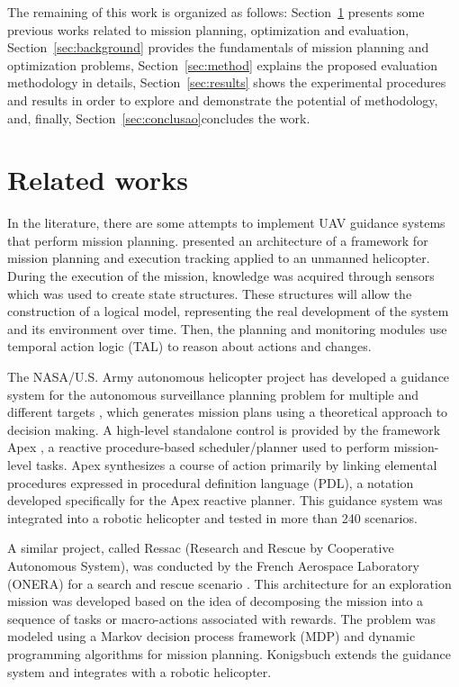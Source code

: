 \documentclass[conference,harvard,brazil,english]{sbatex}
\begin{document}
The remaining of this work is organized as follows: Section~\ref{sec:related} presents some previous works related to mission planning, optimization and evaluation, Section~\ref{sec:background} provides the fundamentals of mission planning and optimization problems, Section~\ref{sec:method} explains the proposed evaluation methodology in details, Section~\ref{sec:results} shows the experimental procedures and results in order to explore and demonstrate the potential of methodology, and, finally, Section~\ref{sec:conclusao}concludes the work.

\section{Related works}
\label{sec:related}

In the literature, there are some attempts to implement UAV guidance systems that perform mission planning.  presented an architecture of a framework for mission planning and execution tracking applied to an unmanned helicopter. During the execution of the mission, knowledge was acquired through sensors which was used to create state structures. These structures will allow the construction of a logical model, representing the real development of the system and its environment over time. Then, the planning and monitoring modules use temporal action logic (TAL) to reason about actions and changes.

The NASA/U.S. Army autonomous helicopter project has developed a guidance system for the autonomous surveillance planning problem for multiple and different targets \cite{whalley2005design}, which generates mission plans using a theoretical approach to decision making. A high-level standalone control is provided by the framework Apex \cite{baer1998nasa}, a reactive procedure-based scheduler/planner used to perform mission-level tasks. Apex synthesizes a course of action primarily by linking elemental procedures expressed in procedural definition language (PDL), a notation developed specifically for the Apex reactive planner. This guidance system was integrated into a robotic helicopter and tested in more than 240 scenarios.

A similar project, called Ressac (Research and Rescue by Cooperative Autonomous System), was conducted by the French Aerospace Laboratory (ONERA) for a search and rescue scenario \cite{fabiani2007autonomous}. This architecture for an exploration mission was developed based on the idea of decomposing the mission into a sequence of tasks or macro-actions associated with rewards. The problem was modeled using a Markov decision process framework (MDP) and dynamic programming algorithms for mission planning. Konigsbuch \cite{teichteil2007multi} extends the guidance system and integrates with a robotic helicopter.
\end{document}
